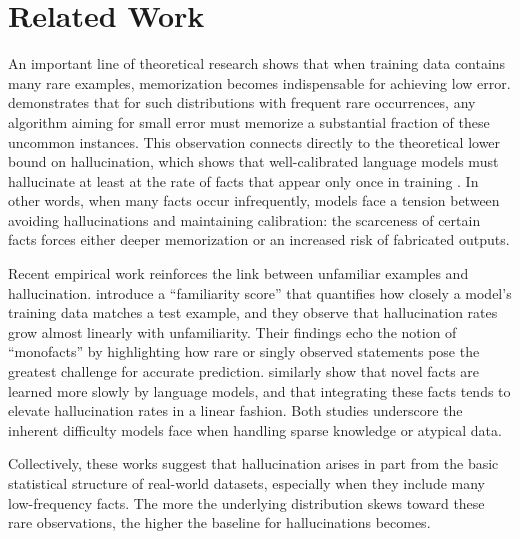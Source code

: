 \section{Related Work}
An important line of theoretical research shows that when training data contains many rare examples, memorization becomes indispensable for achieving low error. \cite{feldman2020does} demonstrates that for such distributions with frequent rare occurrences, any algorithm aiming for small error must memorize a substantial fraction of these uncommon instances. This observation connects directly to the theoretical lower bound on hallucination, which shows that well-calibrated language models must hallucinate at least at the rate of facts that appear only once in training \citep{kalai2024calibrated}. In other words, when many facts occur infrequently, models face a tension between avoiding hallucinations and maintaining calibration: the scarceness of certain facts forces either deeper memorization or an increased risk of fabricated outputs.

Recent empirical work reinforces the link between unfamiliar examples and hallucination. \cite{kang2023unfamiliar} introduce a “familiarity score” that quantifies how closely a model’s training data matches a test example, and they observe that hallucination rates grow almost linearly with unfamiliarity. Their findings echo the notion of “monofacts” by highlighting how rare or singly observed statements pose the greatest challenge for accurate prediction. \cite{gekhman2024does} similarly show that novel facts are learned more slowly by language models, and that integrating these facts tends to elevate hallucination rates in a linear fashion. Both studies underscore the inherent difficulty models face when handling sparse knowledge or atypical data.

Collectively, these works suggest that hallucination arises in part from the basic statistical structure of real-world datasets, especially when they include many low-frequency facts. The more the underlying distribution skews toward these rare observations, the higher the baseline for hallucinations becomes.